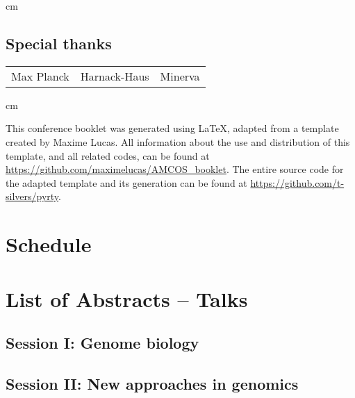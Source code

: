 \documentclass[10pt,a4paper]{scrreprt}
\begin{document}
 cm

\section*{Special thanks}
	\begin{tabular}{l l l}
		Max Planck & Harnack-Haus & Minerva
	\end{tabular}

 cm

\noindent
{\small This conference booklet was generated using \LaTeX{}, adapted from a template created by Maxime Lucas. All information about the use and distribution of this template, and all related codes, can be found at \url{https://github.com/maximelucas/AMCOS_booklet}. The entire source code for the adapted template and its generation can be found at \url{https://github.com/t-silvers/pyrty}.}


\chapter{Schedule}



\chapter{List of Abstracts -- Talks}



\section{Session I: Genome biology}

\section{Session II: New approaches in genomics}
\end{document}
